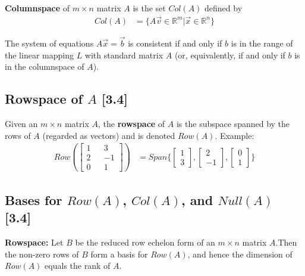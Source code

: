 \documentclass[a4paper,9pt]{extarticle}
\begin{document}
\begin{multicols*}{2}
\noindent \textbf{Columnspace} of $m \times n$ matrix $A$ is the set $Col(A)$ defined by
\begin{equation} \label{3.4-3}
    \begin{split}
        Col(A) & = \{A \vec{v} \in \mathbb{R}^m | \vec{x} \in \mathbb{R}^n\}
    \end{split}
\end{equation}

The system of equations $A \vec{x} = \vec{b}$ is consistent if and only if $b$ is in the range of the linear mapping $L$ with standard matrix $A$ (or, equivalently, if and only if $b$ is in the columnspace of $A$).


\subsection{Rowspace of $A$ [3.4]}
Given an $m \times n$ matrix $A$, the \textbf{rowspace} of $A$ is the subspace spanned by the rows of $A$ (regarded as vectors) and is denoted $Row(A)$. Example:
\begin{equation} \label{3.4-4}
    \begin{split}
        Row(\begin{bmatrix}1 && 3 \\ 2 && -1 \\ 0 && 1\end{bmatrix}) & = Span\{ \begin{bmatrix}1 \\ 3\end{bmatrix}, \begin{bmatrix}2 \\ -1\end{bmatrix}, \begin{bmatrix}0 \\ 1\end{bmatrix}\}
    \end{split}
\end{equation}


\subsection{Bases for $Row(A)$, $Col(A)$, and $Null(A)$ [3.4]}
\textbf{Rowspace:} Let $B$ be the reduced row echelon form of an $m \times n$ matrix $A$.Then the non-zero rows of $B$ form a basis for $Row(A)$, and hence the dimension of $Row(A)$ equals the rank of $A$.\\


\end{multicols*}
\end{document}
